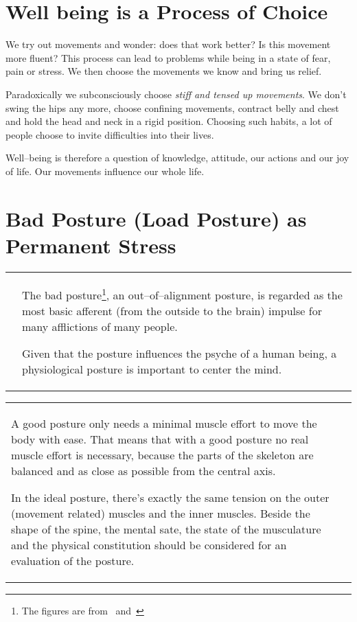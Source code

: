 \documentclass[../main.tex]{subfiles}
\begin{document}
\section{Well being is a Process of Choice}

We try out movements and wonder: does that {work better}?
Is this movement more fluent?
This process can lead to problems while being in a state of fear, pain or stress.
We then choose the movements we know and bring us relief.

Paradoxically we subconsciously choose \emph{stiff and tensed up movements}.
We don't swing the hips any more, choose confining movements, contract belly and chest and hold the head and neck in a rigid position.
Choosing such habits, a lot of people choose to  {invite difficulties} into their lives.

{Well--being} is therefore a question of knowledge, attitude, our actions and our joy of life.
Our movements influence our whole life.

\section{Bad Posture (Load Posture) as Permanent Stress}

\noindent
\begin{minipage}{\textwidth}
\begin{tabular}{p{4cm}p{7.6cm}}

  \raisebox{-0.8\totalheight}{  \texttt{[image: Thumb\_head]} }

  &
The bad posture\footnote{The figures are from~\cite{Haltung} and~\cite{Darmreinig}}\index{posture!bad}, an out--of--alignment posture, is regarded as the {most basic afferent} (from the outside to the brain) impulse for many afflictions of many people. 

Given that the posture influences the psyche of a human being, a physiological posture is important to {center the mind}.\index{posture!psyche} 
\end{tabular}

\noindent
\begin{tabular}{p{7.6cm}p{4cm}}
A good posture only needs a {minimal muscle effort to move} the body with ease.\index{posture!good, natural}
That means that with a good posture no real muscle effort is necessary, because the parts of the skeleton are {balanced} and as close as possible from the {central axis}. 

In the ideal posture, there's exactly the {same tension} on the outer (movement related) muscles and the inner muscles.
{Beside the shape of the spine, the mental sate, the state of the musculature and the physical constitution should be considered for an evaluation of the posture.}
  &
     \raisebox{-0.85\totalheight}{  \texttt{[image: Smiling\_Guy]} }
\end{tabular}
\end{minipage}
\end{document}
